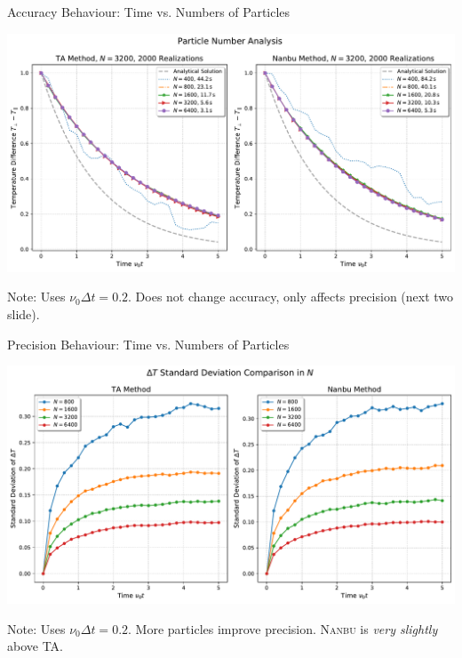 \begin{frame}{Accuracy Behaviour: Time vs. Numbers of Particles}
    \begin{minipage}{\textwidth}
        \centering
        \includegraphics[width=\textwidth]{ressources/test1/temperature_diff_N_combined.pdf}
    \end{minipage}
    Note: Uses $\nu_0\Delta t=0.2$. Does not change accuracy, only affects precision (next two slide). 
\end{frame}

\begin{frame}{Precision Behaviour: Time vs. Numbers of Particles}
    \begin{minipage}{\textwidth}
        \centering
        \includegraphics[width=\textwidth]{ressources/test1/temperature_std_N_comparison.pdf}
    \end{minipage}
    Note: Uses $\nu_0\Delta t=0.2$. More particles improve precision. \textsc{Nanbu} is \textit{very slightly} above TA.
\end{frame}







